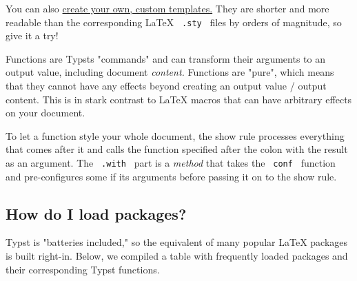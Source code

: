 You can also \href{/docs/tutorial/making-a-template/}{create your own,
custom templates.} They are shorter and more readable than the
corresponding LaTeX \texttt{\ .sty\ } files by orders of magnitude, so
give it a try!

Functions are Typst\textquotesingle s "commands" and can transform their
arguments to an output value, including document \emph{content.}
Functions are "pure", which means that they cannot have any effects
beyond creating an output value / output content. This is in stark
contrast to LaTeX macros that can have arbitrary effects on your
document.

To let a function style your whole document, the show rule processes
everything that comes after it and calls the function specified after
the colon with the result as an argument. The \texttt{\ .with\ } part is
a \emph{method} that takes the \texttt{\ conf\ } function and
pre-configures some if its arguments before passing it on to the show
rule.

\subsection{How do I load packages?}\label{packages}

Typst is "batteries included," so the equivalent of many popular LaTeX
packages is built right-in. Below, we compiled a table with frequently
loaded packages and their corresponding Typst functions.

